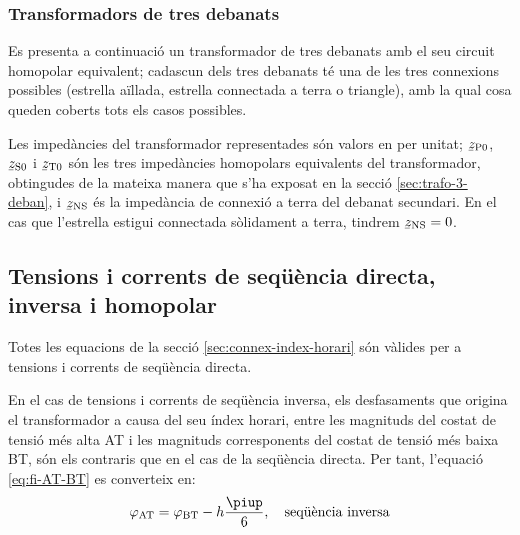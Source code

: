 \begin{center}
    
\end{center}


\subsubsection{Transformadors de tres debanats}\label{sec:cir-hom-3-deb}

Es presenta a continuació un transformador de tres debanats amb el seu circuit homopolar equivalent; cadascun dels tres debanats té una de les tres connexions possibles (estrella aïllada, estrella connectada a terra o triangle), amb la qual cosa queden coberts tots els casos possibles.

Les impedàncies del transformador representades són valors en per unitat; $\cmplx{z}\ped{P0}$, $\cmplx{z}\ped{S0}$ i $\cmplx{z}\ped{T0}$ són les tres impedàncies homopolars equivalents del transformador, obtingudes de la mateixa manera que s'ha exposat en la secció \ref{sec:trafo-3-deban}, i $\cmplx{z}\ped{NS}$ és  la impedància de connexió a terra del debanat secundari. En el cas que l'estrella estigui connectada sòlidament a terra, tindrem $\cmplx{z}\ped{NS}=0$.

\begin{center}
    
\end{center}


\subsection{Tensions i corrents de seqüència directa, inversa i homopolar}

Totes les equacions de la secció \vref{sec:connex-index-horari} són vàlides per a tensions i corrents de seqüència directa.

En el cas de tensions i corrents de seqüència inversa, els desfasaments que origina el transformador a causa del seu índex horari, entre les magnituds  del costat de tensió més alta AT i les magnituds corresponents del costat de tensió més baixa BT, són els contraris que en el cas de la seqüència directa. Per tant, l'equació  \eqref{eq:fi-AT-BT} es converteix en:
\begin{equation}
    \varphi\ped{AT} = \varphi\ped{BT} - h\frac{\piup}{6}, \quad\text{seqüència inversa}
\end{equation}

